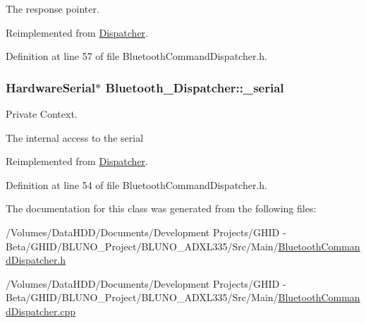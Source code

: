 \-The response pointer. 



\-Reimplemented from \hyperlink{class_dispatcher_a0e3c3d9054c4d8180aa56655bb6206a2}{\-Dispatcher}.



\-Definition at line 57 of file \-Bluetooth\-Command\-Dispatcher.\-h.

\hypertarget{class_bluetooth___dispatcher_a9b30fd1951f4e064a707ec75b941d18e}{
\subsubsection[{\-\_\-serial}]{\setlength{\rightskip}{0pt plus 5cm}\-Hardware\-Serial$\ast$ {\bf \-Bluetooth\-\_\-\-Dispatcher\-::\-\_\-serial}}}\label{class_bluetooth___dispatcher_a9b30fd1951f4e064a707ec75b941d18e}


\-Private \-Context. 

\-The internal access to the serial 

\-Reimplemented from \hyperlink{class_dispatcher_ab761cd7589c1d5fda8ff1b5ec4ce679f}{\-Dispatcher}.



\-Definition at line 54 of file \-Bluetooth\-Command\-Dispatcher.\-h.



\-The documentation for this class was generated from the following files\-:\begin{DoxyCompactItemize}
\item 
/\-Volumes/\-Data\-H\-D\-D/\-Documents/\-Development Projects/\-G\-H\-I\-D -\/ Beta/\-G\-H\-I\-D/\-B\-L\-U\-N\-O\-\_\-\-Project/\-B\-L\-U\-N\-O\-\_\-\-A\-D\-X\-L335/\-Src/\-Main/\hyperlink{_bluetooth_command_dispatcher_8h}{\-Bluetooth\-Command\-Dispatcher.\-h}\item 
/\-Volumes/\-Data\-H\-D\-D/\-Documents/\-Development Projects/\-G\-H\-I\-D -\/ Beta/\-G\-H\-I\-D/\-B\-L\-U\-N\-O\-\_\-\-Project/\-B\-L\-U\-N\-O\-\_\-\-A\-D\-X\-L335/\-Src/\-Main/\hyperlink{_bluetooth_command_dispatcher_8cpp}{\-Bluetooth\-Command\-Dispatcher.\-cpp}\end{DoxyCompactItemize}
